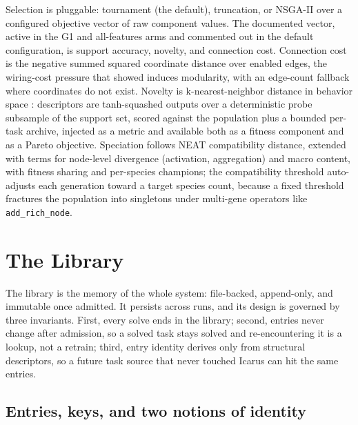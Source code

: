 \documentclass[11pt]{article}
\begin{document}
Selection is pluggable: tournament (the default), truncation, or NSGA-II \citep{deb2002} over a configured objective vector of raw component values. The documented vector, active in the G1 and all-features arms and commented out in the default configuration, is support accuracy, novelty, and connection cost. Connection cost is the negative summed squared coordinate distance over enabled edges, the wiring-cost pressure that \citet{clune2013} showed induces modularity, with an edge-count fallback where coordinates do not exist. Novelty is k-nearest-neighbor distance in behavior space \citep{lehman2011}: descriptors are tanh-squashed outputs over a deterministic probe subsample of the support set, scored against the population plus a bounded per-task archive, injected as a metric and available both as a fitness component and as a Pareto objective. Speciation follows NEAT compatibility distance, extended with terms for node-level divergence (activation, aggregation) and macro content, with fitness sharing and per-species champions; the compatibility threshold auto-adjusts each generation toward a target species count, because a fixed threshold fractures the population into singletons under multi-gene operators like \texttt{add_rich_node}.

\section{The Library}

The library is the memory of the whole system: file-backed, append-only, and immutable once admitted. It persists across runs, and its design is governed by three invariants. First, every solve ends in the library; second, entries never change after admission, so a solved task stays solved and re-encountering it is a lookup, not a retrain; third, entry identity derives only from structural descriptors, so a future task source that never touched Icarus can hit the same entries.

\subsection{Entries, keys, and two notions of identity}
\end{document}
